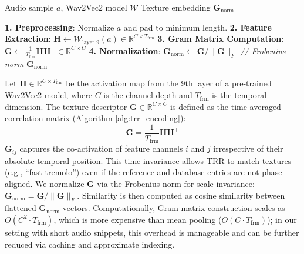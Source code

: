 \documentclass{article}
\begin{document}
\begin{algorithm}[h]
	\caption{Texture Resonance Retrieval (TRR) Encoding}
	\label{alg:trr_encoding}
	\begin{algorithmic}
		\REQUIRE Audio sample $a$, Wav2Vec2 model $\mathcal{W}$
		\ENSURE Texture embedding $\mathbf{G}_{\text{norm}}$

		\STATE \textbf{1. Preprocessing}: Normalize $a$ and pad to minimum length.
		\STATE \textbf{2. Feature Extraction}:
		\STATE $\mathbf{H} \leftarrow \mathcal{W}_{\text{layer 9}}(a) \in \mathbb{R}^{C \times T_{\text{frm}}}$
		\STATE \textbf{3. Gram Matrix Computation}:
		\STATE $\mathbf{G} \leftarrow \frac{1}{T_{\text{frm}}} \mathbf{H}\mathbf{H}^\top \in \mathbb{R}^{C \times C}$
		\STATE \textbf{4. Normalization}:
		\STATE $\mathbf{G}_{\text{norm}} \leftarrow \mathbf{G} / \|\mathbf{G}\|_F$ \hfill \textit{// Frobenius norm}
		\RETURN $\mathbf{G}_{\text{norm}}$
	\end{algorithmic}
\end{algorithm}

Let $\mathbf{H} \in \mathbb{R}^{C \times T_{\text{frm}}}$ be the activation map from the 9th layer of a pre-trained Wav2Vec2 model, where $C$ is the channel depth and $T_{\text{frm}}$ is the temporal dimension. The texture descriptor $\mathbf{G} \in \mathbb{R}^{C \times C}$ is defined as the time-averaged correlation matrix (Algorithm \ref{alg:trr_encoding}):
\begin{equation}
	\mathbf{G} = \frac{1}{T_{\text{frm}}} \mathbf{H}\mathbf{H}^\top
\end{equation}
	$\mathbf{G}_{ij}$ captures the co-activation of feature channels $i$ and $j$ irrespective of their absolute temporal position. This time-invariance allows TRR to match textures (e.g., ``fast tremolo'') even if the reference and database entries are not phase-aligned. We normalize $\mathbf{G}$ via the Frobenius norm for scale invariance: $\mathbf{G}_{\text{norm}} = \mathbf{G} / \|\mathbf{G}\|_F$. Similarity is then computed as cosine similarity between flattened $\mathbf{G}_{\text{norm}}$ vectors.
	Computationally, Gram-matrix construction scales as $O(C^2 \cdot T_{\text{frm}})$, which is more expensive than mean pooling ($O(C \cdot T_{\text{frm}})$); in our setting with short audio snippets, this overhead is manageable and can be further reduced via caching and approximate indexing.
\end{document}
